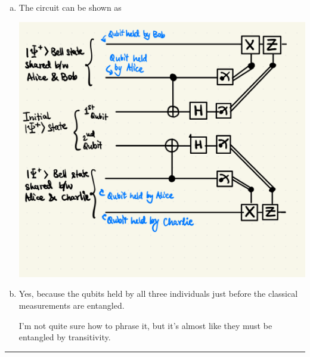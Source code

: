\documentclass[11pt]{article}
\begin{document}
\begin{enumerate}[(a)]
  \item The circuit can be shown as 
  \begin{center}
    \includegraphics*[scale=0.4]{C191 HW3 Q3a.png}
  \end{center}

  \vskip 1cm
  \item Yes, because the qubits held by all three individuals just before the classical measurements are entangled. \begin{note}{I'm not quite sure how to phrase it, but it's almost like they must be entangled by transitivity.}\end{note}
\end{enumerate}

\vskip 1cm
\hrule
\pagebreak















% 
\end{document}
